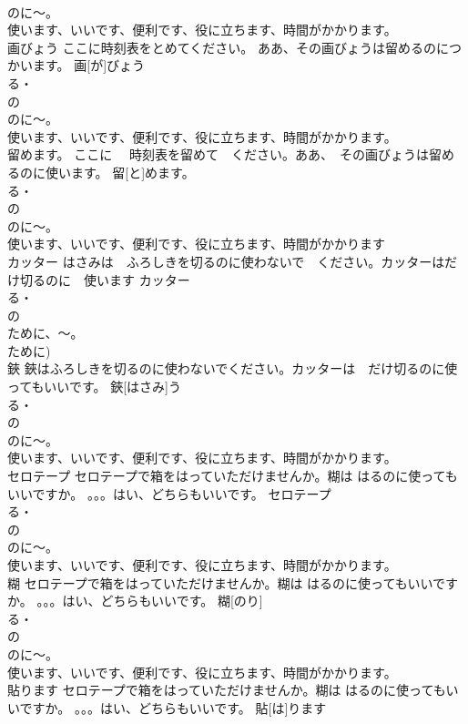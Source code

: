 \documentclass[8pt]{extreport}
\begin{document}
\begin{CJK}{UTF8}{min}
\\	のに～。
\\	使います、いいです、便利です、役に立ちます、時間がかかります。		
\\	画びょう	ここに時刻表をとめてください。 ああ、その画びょうは留めるのにつかいます。	画[が]びょう			
\\	る・
\\	の　
\\	のに～。
\\	使います、いいです、便利です、役に立ちます、時間がかかります。		
\\	留めます。	ここに　 時刻表を留めて　ください。ああ、　その画びょうは留めるのに使います。	留[と]めます。				
\\	る・
\\	の　
\\	のに～。
\\	使います、いいです、便利です、役に立ちます、時間がかかります	
\\	カッター	はさみは　ふろしきを切るのに使わないで　ください。カッターはだけ切るのに　使います	カッター			
\\	る・
\\	の　
\\	ために、～。
\\	ために)
\\	鋏	鋏はふろしきを切るのに使わないでください。カッターは　だけ切るのに使ってもいいです。	鋏[はさみ]う			
\\	る・
\\	の　
\\	のに～。
\\	使います、いいです、便利です、役に立ちます、時間がかかります。		
\\	セロテープ	セロテープで箱をはっていただけませんか。糊は はるのに使ってもいいですか。 。。。はい、どちらもいいです。	セロテープ				
\\	る・
\\	の　
\\	のに～。
\\	使います、いいです、便利です、役に立ちます、時間がかかります。		
\\	糊	セロテープで箱をはっていただけませんか。糊は はるのに使ってもいいですか。 。。。はい、どちらもいいです。	糊[のり]			
\\	る・
\\	の　
\\	のに～。
\\	使います、いいです、便利です、役に立ちます、時間がかかります。	
\\	貼ります	セロテープで箱をはっていただけませんか。糊は はるのに使ってもいいですか。 。。。はい、どちらもいいです。	貼[は]ります			

\end{CJK}
\end{document}
